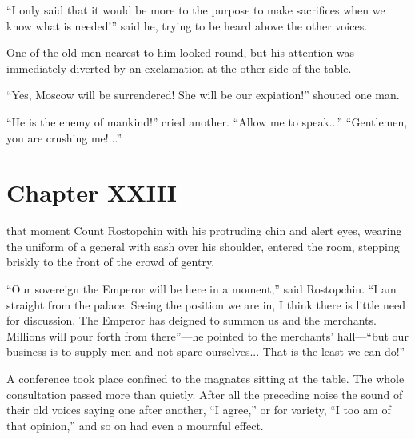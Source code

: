 ``I only said that it would be more to the purpose to make
sacrifices when we know what is needed!'' said he, trying to be
heard above the other voices.

One of the old men nearest to him looked round, but his attention
was immediately diverted by an exclamation at the other side of
the table.

``Yes, Moscow will be surrendered! She will be our expiation!''
shouted one man.

``He is the enemy of mankind!'' cried another. ``Allow me to
speak...''  ``Gentlemen, you are crushing me!...''


\chapter*{Chapter XXIII}
\ifaudio     
{} 
\fi

 that moment Count Rostopchin with his protruding chin and
alert eyes, wearing the uniform of a general with sash over his
shoulder, entered the room, stepping briskly to the front of the
crowd of gentry.

``Our sovereign the Emperor will be here in a moment,'' said
Rostopchin.  ``I am straight from the palace. Seeing the position
we are in, I think there is little need for discussion. The
Emperor has deigned to summon us and the merchants. Millions will
pour forth from there''---he pointed to the merchants'
hall---``but our business is to supply men and not spare
ourselves... That is the least we can do!''

A conference took place confined to the magnates sitting at the
table.  The whole consultation passed more than quietly. After
all the preceding noise the sound of their old voices saying one
after another, ``I agree,'' or for variety, ``I too am of that
opinion,'' and so on had even a mournful effect.

